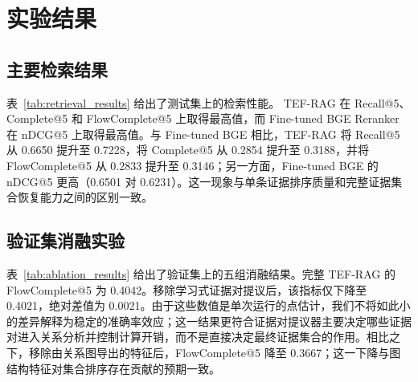 \section{实验结果}
\label{sec:results}

\subsection{主要检索结果}

表~\ref{tab:retrieval_results} 给出了测试集上的检索性能。
TEF-RAG 在 Recall@5、Complete@5 和 FlowComplete@5 上取得最高值，而 Fine-tuned BGE Reranker 在 nDCG@5 上取得最高值。与 Fine-tuned BGE 相比，TEF-RAG 将 Recall@5 从 0.6650 提升至 0.7228，将 Complete@5 从 0.2854 提升至 0.3188，并将 FlowComplete@5 从 0.2833 提升至 0.3146；另一方面，Fine-tuned BGE 的 nDCG@5 更高（0.6501 对 0.6231）。这一现象与单条证据排序质量和完整证据集合恢复能力之间的区别一致。

\begin{table}[t]
\caption{测试集上的主要检索结果（Top-5）。}
\label{tab:retrieval_results}
\centering
\small
\setlength{\tabcolsep}{3pt}
\end{table}

\subsection{验证集消融实验}
\label{sec:ablation_results}

表~\ref{tab:ablation_results} 给出了验证集上的五组消融结果。完整 TEF-RAG 的 FlowComplete@5 为 0.4042。移除学习式证据对提议后，该指标仅下降至 0.4021，绝对差值为 0.0021。由于这些数值是单次运行的点估计，我们不将如此小的差异解释为稳定的准确率效应；这一结果更符合证据对提议器主要决定哪些证据对进入关系分析并控制计算开销，而不是直接决定最终证据集合的作用。相比之下，移除由关系图导出的特征后，FlowComplete@5 降至 0.3667；这一下降与图结构特征对集合排序存在贡献的预期一致。

